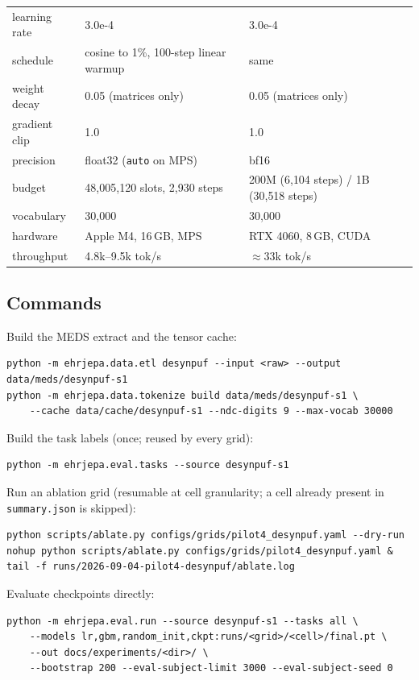 \documentclass[11pt,a4paper]{article}
\newcommand{\code}[1]{\texttt{\small #1}}
\begin{document}
\begin{table}[h]
{\begin{tabular}{lll}
learning rate           & 3.0e-4                  & 3.0e-4 \\
schedule                & cosine to 1\%, 100-step linear warmup & same \\
weight decay            & 0.05 (matrices only)    & 0.05 (matrices only) \\
gradient clip           & 1.0                     & 1.0 \\
precision               & float32 (\code{auto} on MPS) & bf16 \\
budget                  & 48{,}005{,}120 slots, 2{,}930 steps
                        & 200M (6{,}104 steps) / 1B (30{,}518 steps) \\
vocabulary              & 30{,}000                & 30{,}000 \\
hardware                & Apple M4, 16\,GB, MPS   & RTX 4060, 8\,GB, CUDA \\
throughput              & 4.8k--9.5k tok/s        & $\approx$33k tok/s \\
\bottomrule
\end{tabular}}
\end{table}

\subsection{Commands}

Build the MEDS extract and the tensor cache:
\begin{verbatim}
python -m ehrjepa.data.etl desynpuf --input <raw> --output data/meds/desynpuf-s1
python -m ehrjepa.data.tokenize build data/meds/desynpuf-s1 \
    --cache data/cache/desynpuf-s1 --ndc-digits 9 --max-vocab 30000
\end{verbatim}

Build the task labels (once; reused by every grid):
\begin{verbatim}
python -m ehrjepa.eval.tasks --source desynpuf-s1
\end{verbatim}

Run an ablation grid (resumable at cell granularity; a cell already present in
\code{summary.json} is skipped):
\begin{verbatim}
python scripts/ablate.py configs/grids/pilot4_desynpuf.yaml --dry-run
nohup python scripts/ablate.py configs/grids/pilot4_desynpuf.yaml &
tail -f runs/2026-09-04-pilot4-desynpuf/ablate.log
\end{verbatim}

Evaluate checkpoints directly:
\begin{verbatim}
python -m ehrjepa.eval.run --source desynpuf-s1 --tasks all \
    --models lr,gbm,random_init,ckpt:runs/<grid>/<cell>/final.pt \
    --out docs/experiments/<dir>/ \
    --bootstrap 200 --eval-subject-limit 3000 --eval-subject-seed 0
\end{verbatim}
\end{document}
